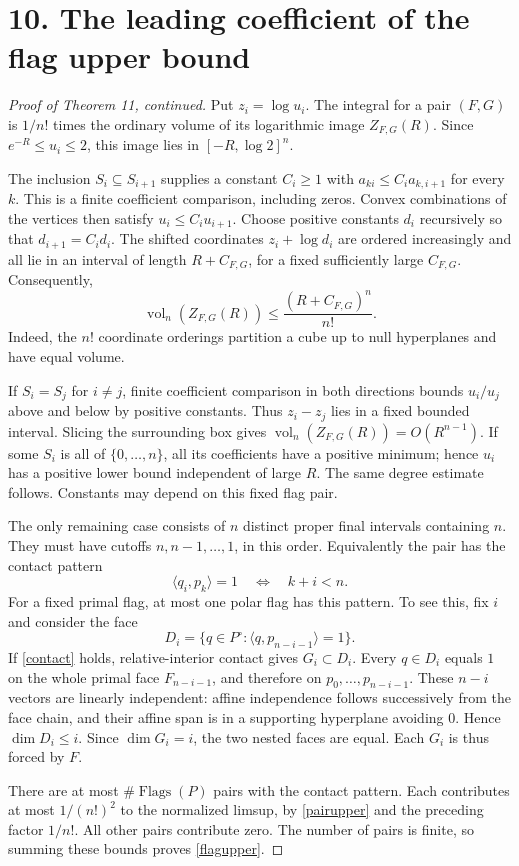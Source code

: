 \documentclass[11pt,a4paper]{article}
\newcommand{\vol}{\operatorname{vol}_n}
\newcommand{\Flags}{\operatorname{Flags}}
\newcommand{\pair}[2]{\langle #1,#2\rangle}
\newcommand{\sect}[1]{\section*{#1}}
\begin{document}
\newpage
\sect{10. The leading coefficient of the flag upper bound}
\begin{proof}[Proof of Theorem 11, continued]
Put $z_i=\log u_i$. The integral for a pair $(F,G)$ is $1/n!$ times
the ordinary volume of its logarithmic image $Z_{F,G}(R)$. Since
$e^{-R}\leq u_i\leq2$, this image lies in $[-R,\log2]^n$.

The inclusion $S_i\subseteq S_{i+1}$ supplies a constant $C_i\geq1$
with $a_{ki}\leq C_i a_{k,i+1}$ for every $k$. This is a finite
coefficient comparison, including zeros. Convex combinations of the
vertices then satisfy $u_i\leq C_i u_{i+1}$. Choose positive constants
$d_i$ recursively so that $d_{i+1}=C_i d_i$. The shifted coordinates
$z_i+\log d_i$ are ordered increasingly and all lie in an interval of
length $R+C_{F,G}$, for a fixed sufficiently large $C_{F,G}$. Consequently,
\begin{equation}\label{pairupper}
 \vol(Z_{F,G}(R))\leq\frac{(R+C_{F,G})^n}{n!}.
\end{equation}
Indeed, the $n!$ coordinate orderings partition a cube up to null
hyperplanes and have equal volume.

If $S_i=S_j$ for $i\ne j$, finite coefficient comparison in both
directions bounds $u_i/u_j$ above and below by positive constants.
Thus $z_i-z_j$ lies in a fixed bounded interval. Slicing the surrounding
box gives $\vol(Z_{F,G}(R))=O(R^{n-1})$. If some $S_i$ is all of
$\{0,\ldots,n\}$, all its coefficients have a positive minimum; hence
$u_i$ has a positive lower bound independent of large $R$. The same
degree estimate follows. Constants may depend on this fixed flag pair.

The only remaining case consists of $n$ distinct proper final intervals
containing $n$. They must have cutoffs $n,n-1,\ldots,1$, in this order.
Equivalently the pair has the contact pattern
\begin{equation}\label{contact}
 \pair{q_i}{p_k}=1\quad\Longleftrightarrow\quad k+i<n.
\end{equation}
For a fixed primal flag, at most one polar flag has this pattern. To see
this, fix $i$ and consider the face
\[
 D_i=\{q\in P^\circ:\pair q{p_{n-i-1}}=1\}.
\]
If \eqref{contact} holds, relative-interior contact gives $G_i\subset D_i$.
Every $q\in D_i$ equals $1$ on the whole primal face $F_{n-i-1}$, and
therefore on $p_0,\ldots,p_{n-i-1}$. These $n-i$ vectors are linearly
independent: affine independence follows successively from the face
chain, and their affine span is in a supporting hyperplane avoiding $0$.
Hence $\dim D_i\leq i$. Since $\dim G_i=i$, the two nested faces are
equal. Each $G_i$ is thus forced by $F$.

There are at most $\#\Flags(P)$ pairs with the contact pattern. Each
contributes at most $1/(n!)^2$ to the normalized limsup, by
\eqref{pairupper} and the preceding factor $1/n!$. All other pairs
contribute zero. The number of pairs is finite, so summing these bounds
proves \eqref{flagupper}.
\end{proof}
\end{document}
